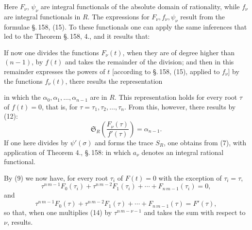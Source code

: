 Here $F_\nu$, $\psi_\nu$ are integral functionals of the absolute domain of rationality,
while $f_\nu$ are integral functionals in $R$. The expressions for $F_\nu, f_\nu, \psi_\nu$
result from the formulae \S.\,158, (15). To these functionals one can apply the same
inferences that led to the Theorem \S.\,158, 4., and it results that:

If now one divides the functions $F_\nu(t)$, when they are of degree higher than $(n-1)$,
by $f(t)$ and takes the remainder of the division; and then in this remainder expresses
the powers of $t$ [according to \S.\,158, (15), applied to $f_\nu$] by the functions
$f_\nu(t)$, there results the representation

in which the $\alpha_0, \alpha_1, \ldots, \alpha_{n-1}$ are  in $R$. This
representation holds for every root $\tau$ of $f(t) = 0$, that is, for $\tau = \tau_1, \tau_2,
\ldots, \tau_n$. From this, however, there results by (12):
\[
\mathfrak{S}_R \left( \frac{F_\nu(\tau)}{f'(\tau)} \right) = \alpha_{n-1}.
\]
If one here divides by $\psi'(\sigma)$ and forms the trace $S_R$, one obtains from (7),
with application of Theorem 4., \S.\,158:
in which $a_\nu$ denotes an integral rational functional.

By (9) we now have, for every root $\tau_i$ of $F(t) = 0$ with the exception of $\tau_i = \tau$,
\[
\tau^{n\,m-1} F_0(\tau_i) + \tau^{n\,m-2} F_1(\tau_i) + \cdots + F_{n\,m-1}(\tau_i) = 0,
\]
and
\[
\tau^{n\,m-1} F_0(\tau) + \tau^{n\,m-2} F_1(\tau) + \cdots + F_{n\,m-1}(\tau) = F'(\tau),
\]
so that, when one multiplies (14) by $\tau^{n\,m-\nu-1}$ and takes the sum with respect
to $\nu$,
results. 
